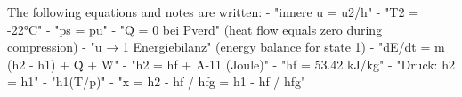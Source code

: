 The following equations and notes are written:  
- "innere u = u2/h"  
- "T2 = -22°C"  
- "ps = pu"  
- "Q̇ = 0 bei Pverd" (heat flow equals zero during compression)  
- "u → 1 Energiebilanz" (energy balance for state 1)  
- "dE/dt = m (h2 - h1) + Q̇ + Ẇ"  
- "h2 = hf + A-11 (Joule)"  
- "hf = 53.42 kJ/kg"  
- "Druck: h2 = h1"  
- "h1(T/p)"  
- "x = h2 - hf / hfg = h1 - hf / hfg"